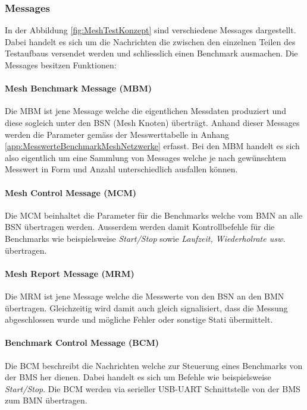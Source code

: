
\subsubsection{Messages}\label{subsubsec:Messages}
In der Abbildung \ref{fig:MeshTestKonzept} sind verschiedene Messages dargestellt. Dabei handelt es sich um die Nachrichten die zwischen den einzelnen Teilen des Testaufbaus versendet werden und schliesslich einen Benchmark ausmachen. Die Messages besitzen Funktionen:

\paragraph{Mesh Benchmark Message (MBM)}
Die MBM ist jene Message welche die eigentlichen Messdaten produziert und diese sogleich unter den BSN (Mesh Knoten) überträgt. Anhand dieser Messages werden die Parameter gemäss der Messwerttabelle in Anhang \ref{app:MesswerteBenchmarkMeshNetzwerke} erfasst. Bei den MBM handelt es sich also eigentlich um eine Sammlung von Messages welche je nach gewünschtem Messwert in Form und Anzahl unterschiedlich ausfallen können.

\paragraph{Mesh Control Message (MCM)}
Die MCM beinhaltet die Parameter für die Benchmarks welche vom BMN an alle BSN übertragen werden. Ausserdem werden damit Kontrollbefehle für die Benchmarks wie beispielsweise \textit{Start/Stop} sowie \textit{Laufzeit, Wiederholrate usw.} übertragen.

\paragraph{Mesh Report Message (MRM)}
Die MRM ist jene Message welche die Messwerte von den BSN an den BMN übertragen. Gleichzeitig wird damit auch gleich signalisiert, dass die Messung abgeschlossen wurde und mögliche Fehler oder sonstige Stati übermittelt.

\paragraph{Benchmark Control Message (BCM)}
Die BCM beschreibt die Nachrichten welche zur Steuerung eines Benchmarks von der BMS her dienen. Dabei handelt es sich um Befehle wie beispielsweise \textit{Start/Stop}. Die BCM werden via serieller USB-UART Schnittstelle von der BMS zum BMN übertragen.

